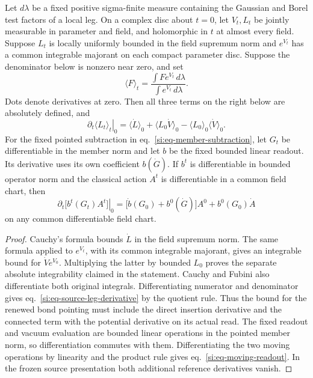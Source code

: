 \documentclass[11pt,letterpaper,reqno]{amsart}
\makeatletter
\numberwithin{equation}{section}
\renewcommand{\eqref}[1]{\textup{eq.~\ref{#1}}}
\theoremstyle{definition}
\newcommand{\ms@minorstart}{%
  \pushQED{\qed}\renewcommand{\qedsymbol}{$\blacksquare$}}
\newenvironment{lemma}[1][]{\ms@minorstart\ms@lemma[#1]}
  {\popQED\endms@lemma}
\theoremstyle{remark}
\makeatother
\begin{document}
\begin{samepage}
\begin{lemma}[First variations at fixed reference]
\label{si:lem-source-first-variations}
Let $d\lambda$ be a fixed positive sigma-finite measure containing
the Gaussian and Borel test factors of a local leg. On a complex
disc about $t=0$, let $V_t,L_t$ be jointly measurable in parameter
and field, and holomorphic in $t$ at almost every field. Suppose
$L_t$ is locally uniformly bounded in the field supremum norm
and $e^{V_t}$ has a common integrable majorant on each compact
parameter disc. Suppose the denominator below is nonzero near
zero, and set
\[
 \langle F\rangle_t=
 \frac{\int F e^{V_t}\,d\lambda}{\int e^{V_t}\,d\lambda}.
\]
Dots denote derivatives at zero. Then all three terms on the
right below are absolutely defined, and
\begin{equation}\label{si:eq-source-leg-derivative}
 \left.\partial_t\langle L_t\rangle_t\right|_0
   =\langle\dot L\rangle_0+\langle L_0\dot V\rangle_0
                   -\langle L_0\rangle_0\langle\dot V\rangle_0.
\end{equation}
For the fixed pointed subtraction in \eqref{si:eq-member-subtraction},
let $G_t$ be differentiable in the member norm and let $b$ be the
fixed bounded linear readout. Its derivative uses its own
coefficient $b(\dot G)$. If $b^t$ is differentiable in bounded
operator norm and the classical action $A^t$ is differentiable
in a common field chart, then
\begin{equation}\label{si:eq-moving-readout}
 \left.\partial_t\bigl[b^t(G_t)A^t\bigr]\right|_0
 =\bigl[\dot b(G_0)+b^0(\dot G)\bigr]A^0+b^0(G_0)\dot A
\end{equation}
on any common differentiable field chart.
\end{lemma}
\end{samepage}
\begin{proof}
Cauchy's formula bounds $\dot L$ in the field supremum norm.
The same formula applied to $e^{V_t}$, with its common integrable
majorant, gives an integrable bound for $\dot V e^{V_0}$.
Multiplying the latter by bounded $L_0$ proves the separate
absolute integrability claimed in the statement. Cauchy and
Fubini also differentiate both original integrals. Differentiating numerator and
denominator gives \eqref{si:eq-source-leg-derivative} by the
quotient rule. Thus the bound for the renewed bond pointing must
include the direct insertion derivative and the connected term
with the potential derivative on its actual read. The fixed
readout and vacuum evaluation are bounded linear operations
in the pointed member norm, so differentiation commutes with
them. Differentiating the two moving operations by linearity
and the product rule gives \eqref{si:eq-moving-readout}. In the
frozen source presentation both additional reference derivatives
vanish.
\end{proof}
\end{document}

